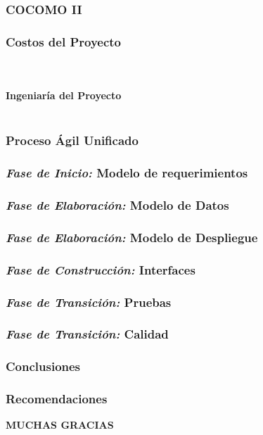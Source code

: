 \documentclass[xcolor=dvipsnames]{beamer}
\begin{document}
\begin{frame}
    \frametitle{COCOMO II}
\end{frame}

\begin{frame}
    \frametitle{Costos del Proyecto}
\end{frame}

\begin{frame}
    \centering\color{color3}{\rule{10cm}{5pt}}\\
    \vspace{-3mm}
    \centering\color{color3}{\rule{10cm}{1.5pt}}\\
    \vspace{2mm}
    \centering\textbf{\huge{\textcolor{color1}{Ingeniaría del Proyecto}}}\\
    \centering\color{color3}{\rule{10cm}{1.5pt}}\\
\end{frame}

\begin{frame}
    \frametitle{Proceso Ágil Unificado}
\end{frame}

\begin{frame}
    \frametitle{\textit{Fase de Inicio:} Modelo de requerimientos}
\end{frame}

\begin{frame}
    \frametitle{\textit{Fase de Elaboración:} Modelo de Datos}
\end{frame}

\begin{frame}
    \frametitle{\textit{Fase de Elaboración:} Modelo de Despliegue}
\end{frame}

\begin{frame}
    \frametitle{\textit{Fase de Construcción:} Interfaces}
\end{frame}

\begin{frame}
    \frametitle{\textit{Fase de Transición:} Pruebas}
\end{frame}

\begin{frame}
    \frametitle{\textit{Fase de Transición:} Calidad}
\end{frame}

\begin{frame}
    \frametitle{Conclusiones}
\end{frame}

\begin{frame}
    \frametitle{Recomendaciones}
\end{frame}

\begin{frame}
    \centering\textbf{\huge{\textcolor{color1}{MUCHAS GRACIAS}}}    
\end{frame}
\end{document}
